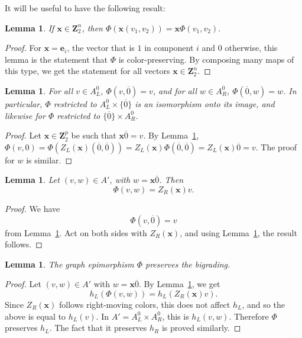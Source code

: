 \documentclass[12pt,twoside,singlespace]{article}
\numberwithin{equation}{section}
\newtheorem{lem}[equation]{Lemma}
\theoremstyle{definition}
\newcommand{\ZZ}{\mathbf{Z}}
\renewcommand{\vec}[1]{\mathbf{#1}}
\begin{document}
It will be useful to have the following result:
\begin{lem}
\label{lem:gphi}
If $\vec{x}\in \ZZ_2^n$, then $\Phi(\vec{x}(v_1,v_2))=\vec{x}\Phi(v_1,v_2).$
\end{lem}
\begin{proof}
For $\vec{x}=\vec{e}_i$, the vector that is $1$ in component $i$ and $0$ otherwise, this lemma is the statement that $\Phi$ is color-preserving.  By composing many maps of this type, we get the statement for all vectors $\vec{x}\in \ZZ_2^n$.
\end{proof}

\begin{lem}
\label{lem:phisides}
For all $v\in A_L^0$, $\Phi(v,\overline{0})=v$, and for all $w\in A_R^0$, $\Phi(\overline{0},w)=w$.  In particular, $\Phi$ restricted to $A_L^0\times\{\overline{0}\}$ is an isomorphism onto its image, and likewise for $\Phi$ restricted to $\{\overline{0}\}\times A_R^0$.
\end{lem}
\begin{proof}
Let $\vec{x}\in \ZZ_2^p$ be such that $\vec{x}\overline{0}=v$.  By Lemma~\ref{lem:gphi}, $\Phi(v,0) = \Phi(Z_L(\vec{x})(\overline{0},\overline{0})) = Z_L(\vec{x})\Phi(\overline{0},\overline{0})=Z_L(\vec{x})\overline{0}=v$.  The proof for $w$ is similar.
\end{proof}

\begin{lem}
\label{lem:phiformula}
Let $(v,w)\in A'$, with $w=\vec{x}\overline{0}$.  Then
\[\Phi(v,w)=Z_R(\vec{x})v.\]
\end{lem}
\begin{proof}
We have
\[\Phi(v,\overline{0})=v\]
from Lemma~\ref{lem:phisides}.  Act on both sides with $Z_R(\vec{x})$, and using Lemma~\ref{lem:gphi}, the result follows.
\end{proof}

\begin{lem}
\label{lem:mainepibigrading}
The graph epimorphism $\Phi$ preserves the bigrading.
\end{lem}
\begin{proof}
Let $(v,w)\in A'$ with $w=\vec{x}\overline{0}$.  By Lemma~\ref{lem:phiformula}, we get
\[h_L(\Phi(v,w))=h_L(Z_R(\vec{x})v).\]
Since $Z_R(\vec{x})$ follows right-moving colors, this does not affect $h_L$, and so the above is equal to $h_L(v)$.  In $A'=A_L^0\times A_R^0$, this is $h_L(v,w)$. Therefore $\Phi$ preserves $h_L$.  The fact that it preserves $h_R$ is proved similarly.
\end{proof}
\end{document}

